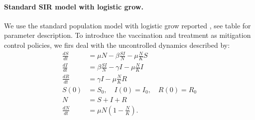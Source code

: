 \paragraph{Standard SIR model with logistic grow.}
We use the standard population model with logistic grow reported
\cite{Schaefer2009}, see table for parameter description. To introduce the 
vaccination and treatment as mitigation control policies, we firs deal with the
uncontrolled dynamics described by:
\begin{equation}
	\begin{aligned}
		\frac{dS}{dt} &=
			\mu N  
			- \beta \frac{S I}{N} 
			- \mu \frac{N}{K} S 
		\\
		\frac{dI}{dt} &=
			\beta \frac{S I}{N}
			- \gamma I
			- \mu \frac{N}{K} I
		\\
		\frac{dR}{dt} &= 
			\gamma I 
			- \mu \frac{N}{K} R 
		\\
		S(0) &= S_0, \quad
		I(0) = I_0, \quad
		R(0) = R_0
		\\
		N &= S + I +R
		\\
		\frac{dN}{dt} &=
			\mu N 
			\left(
				1 - \frac{N}{K}
			\right).
	\end{aligned}
\end{equation}

